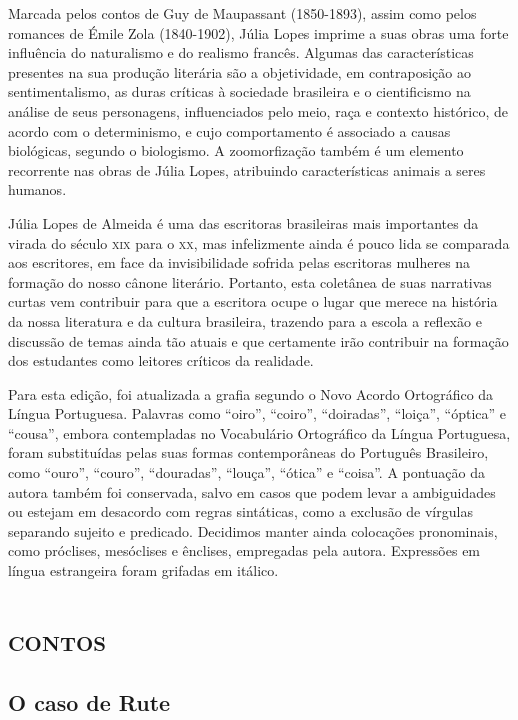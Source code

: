 Marcada pelos contos de Guy de Maupassant (1850-1893), assim como pelos
romances de Émile Zola (1840-1902), Júlia Lopes imprime a suas obras uma
forte influência do naturalismo e do realismo francês. Algumas das
características presentes na sua produção literária são a objetividade,
em contraposição ao sentimentalismo, as duras críticas à sociedade
brasileira e o cientificismo na análise de seus personagens,
influenciados pelo meio, raça e contexto histórico, de acordo com o
determinismo, e cujo comportamento é associado a causas biológicas,
segundo o biologismo. A zoomorfização também é um elemento recorrente
nas obras de Júlia Lopes, atribuindo características animais a seres
humanos.

Júlia Lopes de Almeida é uma das escritoras brasileiras mais importantes
da virada do século \textsc{xix} para o \textsc{xx}, mas infelizmente ainda é pouco lida
se comparada aos escritores, em face da invisibilidade sofrida pelas
escritoras mulheres na formação do nosso cânone literário. Portanto,
esta coletânea de suas narrativas curtas vem contribuir para que a
escritora ocupe o lugar que merece na história da nossa literatura e da
cultura brasileira, trazendo para a escola a reflexão e discussão de
temas ainda tão atuais e que certamente irão contribuir na formação dos
estudantes como leitores críticos da realidade.

Para esta edição, foi atualizada a grafia segundo o Novo Acordo
Ortográfico da Língua Portuguesa. Palavras como ``oiro'', ``coiro'',
``doiradas'', ``loiça'', ``óptica'' e ``cousa'', embora contempladas no
Vocabulário Ortográfico da Língua Portuguesa, foram substituídas pelas
suas formas contemporâneas do Português Brasileiro, como ``ouro'',
``couro'', ``douradas'', ``louça'', ``ótica'' e ``coisa''. A pontuação
da autora também foi conservada, salvo em casos que podem levar a
ambiguidades ou estejam em desacordo com regras sintáticas, como a
exclusão de vírgulas separando sujeito e predicado. Decidimos manter
ainda colocações pronominais, como próclises, mesóclises e ênclises,
empregadas pela autora. Expressões em língua estrangeira foram grifadas
em itálico.


\part{\textsc{contos}}

\chapter{O caso de Rute}

